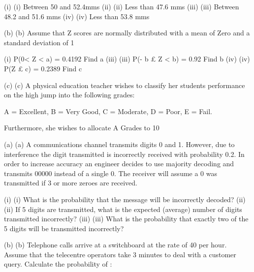 (i)	(i)                  Between 50 and 52.4mms
(ii)	(ii)                Less than 47.6 mms
(iii)	(iii)               Between 48.2 and 51.6 mms
(iv)	(iv)              Less than 53.8 mms

 
(b)	(b)   Assume that Z scores are normally distributed with a mean of Zero and a standard deviation of 1
 
(i) 	      P(0< Z < a) = 0.4192	Find a
(iii)	(iii)               P(- b £ Z < b) = 0.92	Find b
(iv)	(iv)              P(Z £ c) = 0.2389 		Find c
 
(c)	(c)    A physical education teacher wishes to classify her students performance on the high jump into the following grades:
 
A = Excellent, B = Very Good, C = Moderate, D = Poor, E = Fail.
 
Furthermore, she wishes to allocate  A Grades to 10%
 
 
 
 
 
 
 

(a)	(a)    A communications channel transmits digits 0 and 1.  However, due to interference the digit transmitted is incorrectly received with probability 0.2.  In order to increase accuracy an engineer decides to use majority decoding and transmits 00000 instead of a single 0.  The receiver will assume a 0 was transmitted if 3 or more zeroes are received. 
 
(i)	(i)                  What is the probability that the message will be incorrectly decoded?
(ii)	(ii)                If 5 digits are transmitted, what is the expected (average) number of digits transmitted incorrectly?
(iii)	(iii)               What is the probability that exactly two of the 5 digits will be transmitted incorrectly?
 

(b)	(b)   Telephone calls arrive at a switchboard at the rate of 40 per hour.  Assume that the telecentre operators take 3 minutes to deal with a customer query.  Calculate the probability of :
 
